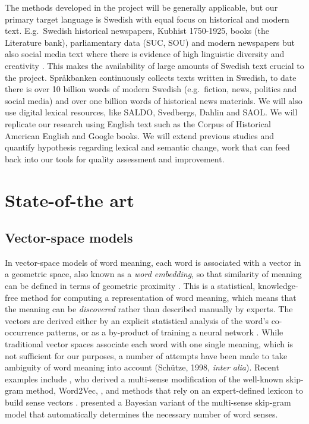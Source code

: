 \documentclass[12pt,twoside,a4paper]{article}
\newcommand\eg{{e.g.\ }}
\newcommand\Eg{{E.g.\ }}
\begin{document}
	The methods developed in the project will be generally applicable, but our primary target language is Swedish with equal focus on historical and modern text. \Eg Swedish historical newspapers, Kubhist 1750-1925, books (the Literature bank), parliamentary data (SUC, SOU) and modern newspapers but also social media text where there is evidence of high linguistic diversity and creativity \citep{goel2016social}. This makes the availability of large amounts of Swedish text crucial to the project. Språkbanken continuously collects texts written in Swedish, to date there is over 10 billion words of modern Swedish (\eg fiction, news, politics and social media) and over one billion words of historical news materials. We will also use digital lexical resources, like SALDO, Svedbergs, Dahlin and SAOL. We will replicate our research using English text such as the Corpus of Historical American English and Google books. We will extend previous studies and quantify hypothesis regarding lexical and semantic change, work that can feed back into our tools for quality assessment and improvement. 

\vspace{-0.35cm}
	\section{State-of-the art}\label{sec:sota}
    \vspace{-0.2cm}
	\subsection{Vector-space models}
	In vector-space models of word meaning, each word is associated with a vector in a geometric space, also known as a \emph{word embedding}, so that similarity of meaning can be defined in terms of geometric proximity \citep{sahlgren2006,turney2010frequency}.
	This is a statistical, knowledge-free method for computing a representation of word meaning, which means that the meaning can be \emph{discovered} rather than described manually by experts.
	 The vectors are derived either by an explicit statistical analysis of the word's co-occurrence patterns, or as a by-product of training a neural network \citep{baroni2014}.
	While traditional vector spaces associate each word with one single meaning, which is not sufficient for our purposes, a number of attempts have been made to take ambiguity of word meaning into account (Schütze, 1998, \emph{inter 	alia})\nocite{schutze1998}. Recent examples include 
	\cite{nietopina2015}, who derived a multi-sense modification of the well-known skip-gram method, Word2Vec, \citep{mikolov2013}, and methods that rely on an expert-defined lexicon to build sense vectors	\citep{johansson2015embedding}. \cite{bartunov2016} presented a
	Bayesian variant of the multi-sense skip-gram model that automatically determines the necessary number of word senses. 
    
\end{document}
